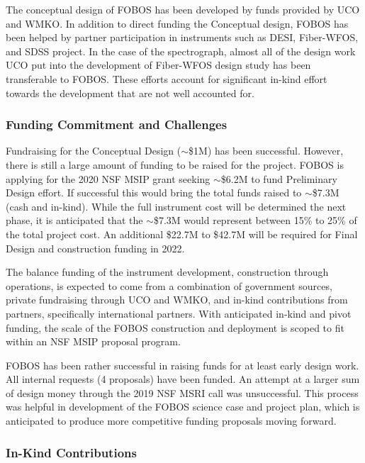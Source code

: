 \documentclass[oneside,11pt]{amsart}
\begin{document}
The conceptual design of FOBOS has been developed by funds provided by UCO and WMKO.  In addition to direct funding the Conceptual design, FOBOS has been helped by partner participation in instruments such as DESI, Fiber-WFOS, and SDSS project.  In the case of the spectrograph, almost all of the design work UCO put into the development of Fiber-WFOS design study has been transferable to FOBOS.  These efforts account for significant in-kind effort towards the development that are not well accounted for.

\subsubsection{Funding Commitment and Challenges}

Fundraising for the Conceptual Design ($\sim$\$1M) has been successful.  However, there is still a large amount of funding to be raised for the project.  FOBOS is applying for the 2020 NSF MSIP grant seeking $\sim$\$6.2M to fund Preliminary Design effort.  If successful this would bring the total funds raised to $\sim$\$7.3M (cash and in-kind).  While the full instrument cost will be determined the next phase, it is anticipated that the $\sim$\$7.3M would represent between 15\% to 25\% of the total project cost.  An additional \$22.7M to \$42.7M will be required for Final Design and construction funding in 2022.


The balance funding of the instrument development, construction through operations, is expected to come from a combination of government sources, private fundraising through UCO and WMKO, and in-kind contributions from partners, specifically international partners. With anticipated in-kind and pivot funding, the scale of the FOBOS construction and deployment is scoped to fit within an NSF MSIP proposal program.

FOBOS has been rather successful in raising funds for at least early design work.  All internal requests (4 proposals) have been funded.  An attempt at a larger sum of design money through the 2019 NSF MSRI call was unsuccessful. This process was helpful in development of the FOBOS science case and project plan, which is anticipated to produce more competitive funding proposals moving forward.

\subsubsection{In-Kind Contributions}
\end{document}
